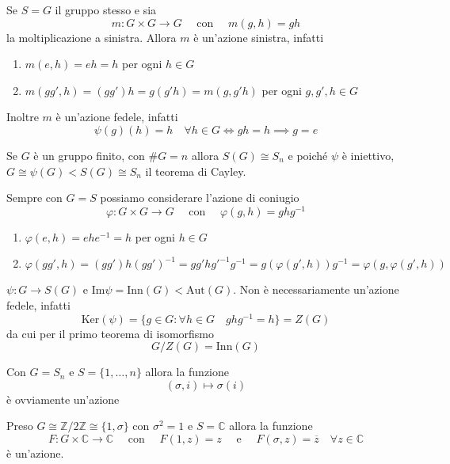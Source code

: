 \begin{example}
    Se \(S = G\) il gruppo stesso e sia
    \[
        m : G \times G \to G \quad \text{ con } \quad m{(g, h)} = gh
    \]
    la moltiplicazione a sinistra. Allora \(m\) è un'azione sinistra, infatti
\begin{enumerate}[label = \roman*)]
    \item \(m {(e, h)} = eh = h\) per ogni \(h \in G\) 
    \item \(m {(gg', h)} = {(g g')}h = g{(g'h)} = m {(g, g'h)}\) per ogni \(g,
        g', h \in G\) 
\end{enumerate}
    Inoltre \(m\) è un'azione fedele, infatti 
    \[
        \psi{(g)}{(h)} = h \quad\forall h \in G \iff gh = h \implies g = e
    \]
    \begin{remark}
        Se \(G\) è un gruppo finito, con \(\# G = n\) allora \(S{(G)} \cong S_n\)
        e poiché \(\psi\) è iniettivo, \(G \cong \psi{(G)} <  S{(G)} \cong S_n\)
        il teorema di Cayley.
    \end{remark}
\end{example}
\begin{example}
    Sempre con \(G = S\) possiamo considerare l'azione di coniugio
    \[
        \varphi : G \times G \to G \quad \text{ con } \quad \varphi{(g, h)} =
        ghg^{-1}
    \]
    \begin{enumerate}[label = \roman*)]
        \item \(\varphi{(e, h)} = ehe^{-1} = h\) per ogni \(h \in G\)
        \item \(\varphi {(g g', h)} = {(g g')}h {( g g' )}^{-1} = g g' h g'^{-1}
            g^{-1} = g{(\varphi {(g', h)})} g ^{-1} = \varphi {(g, \varphi {(g',
            h)})}\) 
    \end{enumerate}
    \(\psi : G \to S(G)\) e \(\mathrm{Im} \psi = \mathrm{Inn} {(G)} <
    \mathrm{Aut}{(G)}\). Non è necessariamente un'azione fedele, infatti
    \[
        \mathrm{Ker}{(\psi)} = \{g \in G : \forall h \in G \quad ghg^{-1} = h\} =
        Z(G)
    \]
    da cui per il primo teorema di isomorfismo
    \[
      G / Z{(G)} = \mathrm{Inn}{(G)}
    \]
\end{example}
\begin{example}
    Con \(G = S_n\) e \(S = \{1, \dots, n\} \) allora la funzione
    \[
        (\sigma, i) \mapsto \sigma{(i)}
    \]
    è ovviamente un'azione
\end{example}
\begin{example}
    Preso \(G \cong \mathbb{Z} / 2 \mathbb{Z} \cong \{1, \sigma\} \) con
    \(\sigma^2 = 1\)  e \(S = \mathbb{C}\) allora la funzione
    \[
        F : G \times \mathbb{C} \to \mathbb{C} \quad \text{ con } \quad F{(1,
        z)} = z \quad \text{ e } \quad F{(\sigma, z)} = \overline{z} \quad
        \forall z \in \mathbb{C}
    \]
    è un'azione.
\end{example}
